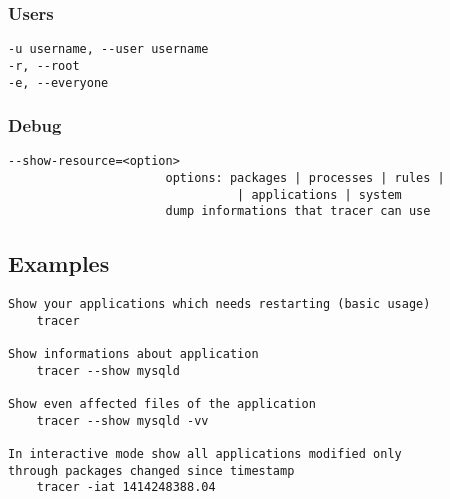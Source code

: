 \subsubsection{Users%
  \label{users}%
}
%
\begin{lstlisting}
-u username, --user username
-r, --root
-e, --everyone
\end{lstlisting}


\subsubsection{Debug%
  \label{debug}%
}
%
\begin{lstlisting}
--show-resource=<option>
                      options: packages | processes | rules |
		                        | applications | system
                      dump informations that tracer can use
\end{lstlisting}


\subsection{Examples%
  \label{examples}%
}
%
\begin{lstlisting}
Show your applications which needs restarting (basic usage)
    tracer

Show informations about application
    tracer --show mysqld

Show even affected files of the application
    tracer --show mysqld -vv

In interactive mode show all applications modified only
through packages changed since timestamp
    tracer -iat 1414248388.04
\end{lstlisting}
